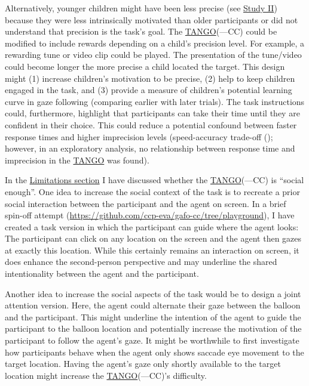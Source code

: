 \documentclass[
]{scrbook}
\begin{document}
Alternatively, younger children might have been less precise (see \hyperref[studyII]{Study II}) because they were less intrinsically motivated than older participants or did not understand that precision is the task's goal. The \hyperref[acronyms_TANGO]{TANGO}(---CC) could be modified to include rewards depending on a child's precision level. For example, a rewarding tune or video clip could be played. The presentation of the tune/video could become longer the more precise a child located the target. This design might (1) increase children's motivation to be precise, (2) help to keep children engaged in the task, and (3) provide a measure of children's potential learning curve in gaze following (comparing earlier with later trials). The task instructions could, furthermore, highlight that participants can take their time until they are confident in their choice. This could reduce a potential confound between faster response times and higher imprecision levels (speed-accuracy trade-off (); however, in an exploratory analysis, no relationship between response time and imprecision in the \hyperref[acronyms_TANGO]{TANGO} was found).

In the \hyperref[limitations]{Limitations section} I have discussed whether the \hyperref[acronyms_TANGO]{TANGO}(---CC) is ``social enough''. One idea to increase the social context of the task is to recreate a prior social interaction between the participant and the agent on screen. In a brief spin-off attempt (\mbox{\url{https://github.com/ccp-eva/gafo-cc/tree/playground}}), I have created a task version in which the participant can guide where the agent looks: The participant can click on any location on the screen and the agent then gazes at exactly this location. While this certainly remains an interaction on screen, it does enhance the second-person perspective and may underline the shared intentionality between the agent and the participant.

Another idea to increase the social aspects of the task would be to design a joint attention version. Here, the agent could alternate their gaze between the balloon and the participant. This might underline the intention of the agent to guide the participant to the balloon location and potentially increase the motivation of the participant to follow the agent's gaze. It might be worthwhile to first investigate how participants behave when the agent only shows saccade eye movement to the target location. Having the agent's gaze only shortly available to the target location might increase the \hyperref[acronyms_TANGO]{TANGO}(---CC)'s difficulty.
\end{document}
